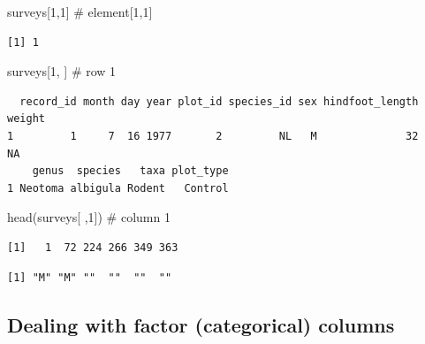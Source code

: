 \documentclass[
  letterpaper,
  DIV=11,
  numbers=noendperiod]{scrreprt}
\newenvironment{Shaded}{\begin{snugshade}}{\end{snugshade}}
\newcommand{\CommentTok}[1]{\textcolor[rgb]{0.37,0.37,0.37}{#1}}
\newcommand{\DecValTok}[1]{\textcolor[rgb]{0.68,0.00,0.00}{#1}}
\newcommand{\FunctionTok}[1]{\textcolor[rgb]{0.28,0.35,0.67}{#1}}
\newcommand{\NormalTok}[1]{\textcolor[rgb]{0.00,0.23,0.31}{#1}}
\newcommand{\SpecialCharTok}[1]{\textcolor[rgb]{0.37,0.37,0.37}{#1}}
\begin{document}
\begin{Shaded}
\begin{Highlighting}[]
\NormalTok{surveys[}\DecValTok{1}\NormalTok{,}\DecValTok{1}\NormalTok{]    }\CommentTok{\# element[1,1]}
\end{Highlighting}
\end{Shaded}

\begin{verbatim}
[1] 1
\end{verbatim}

\begin{Shaded}
\begin{Highlighting}[]
\NormalTok{surveys[}\DecValTok{1}\NormalTok{, ]    }\CommentTok{\# row 1}
\end{Highlighting}
\end{Shaded}

\begin{verbatim}
  record_id month day year plot_id species_id sex hindfoot_length weight
1         1     7  16 1977       2         NL   M              32     NA
    genus  species   taxa plot_type
1 Neotoma albigula Rodent   Control
\end{verbatim}

\begin{Shaded}
\begin{Highlighting}[]
\FunctionTok{head}\NormalTok{(surveys[ ,}\DecValTok{1}\NormalTok{])  }\CommentTok{\# column 1}
\end{Highlighting}
\end{Shaded}

\begin{verbatim}
[1]   1  72 224 266 349 363
\end{verbatim}

\begin{Shaded}
\end{Shaded}

\begin{verbatim}
[1] "M" "M" ""  ""  ""  "" 
\end{verbatim}

\subsection{Dealing with factor (categorical)
columns}\label{dealing-with-factor-categorical-columns}
\end{document}
